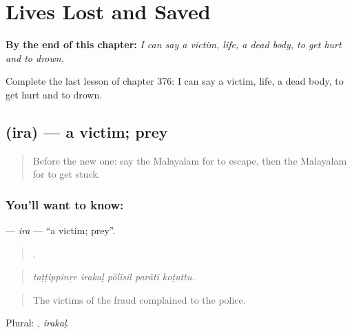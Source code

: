 
\chapter{Lives Lost and Saved}
\label{ch:ml-lives-lost-and-saved}

\begin{chapteropening}
\textbf{By the end of this chapter:} \emph{I can say a victim, life, a dead body, to get hurt and to drown.}

Complete the last lesson of chapter 376: I can say a victim, life, a dead body, to get hurt and to drown.
\end{chapteropening}

\section[\texorpdfstring{\ml{ഇര} (ira)}{ഇര (ira)}]{ (ira) — a victim; prey}

\label{lesson:ML-C376-ira}



\begin{quote}
Before the new one: say the Malayalam for to escape, then the Malayalam for to get stuck.
\end{quote}

\subsection*{You'll want to know: }
\textbf{} — \emph{ira} — \textquotedblleft{}a victim; prey\textquotedblright{}.

\begin{quote}
    .
\end{quote}

\begin{quote}
\emph{taṭṭippinṟe irakaḷ pōlīsil parāti koṭuttu.}
\end{quote}

\begin{quote}
The victims of the fraud complained to the police.
\end{quote}

Plural: , \emph{irakaḷ}.

